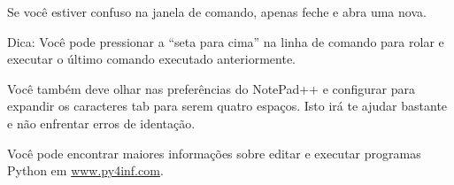 Se você estiver confuso na janela de comando, apenas feche e abra
uma nova.
%

Dica: Você pode pressionar a ``seta para cima'' na linha de comando
para rolar e executar o último comando executado anteriormente.
%

Você também deve olhar nas preferências do NotePad++ e configurar
para expandir os caracteres tab para serem quatro espaços. Isto irá
te ajudar bastante e não enfrentar erros de identação.
%

Você pode encontrar maiores informações sobre editar e executar
programas Python em \url{www.py4inf.com}.

